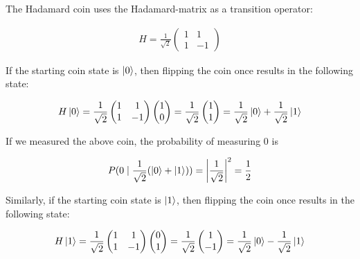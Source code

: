 The Hadamard coin uses the Hadamard-matrix as a transition operator:

\begin{align*}
  H = \frac{1}{\sqrt{2}}\begin{pmatrix}
      1 & 1  \\
      1 & -1
    \end{pmatrix}
\end{align*}

If the starting coin state is $\ket{0}$, then flipping the coin once results in the following state:

\begin{align*}
 H\ket{0} = \frac{1}{\sqrt{2}}\begin{pmatrix}
      1 & 1  \\
      1 & -1
    \end{pmatrix} \begin{pmatrix} 1 \\ 0 \end{pmatrix}
    = \frac{1}{\sqrt{2}} \begin{pmatrix} 1 \\ 1 \end{pmatrix} = \frac{1}{\sqrt{2}} \ket{0} + \frac{1}{\sqrt{2}} \ket{1}
\end{align*}

If we measured the above coin, the probability of measuring $0$ is

\begin{align*}
P(0 \mid \frac{1}{\sqrt{2}} (\ket{0} + \ket{1})) =
\left\lvert\frac{1}{\sqrt{2}}\right\rvert^2 =
\frac{1}{2}
\end{align*}

Similarly, if the starting coin state is $\ket{1}$, then flipping the coin once results in the following state:

\begin{align*}
   H\ket{1} = \frac{1}{\sqrt{2}}\begin{pmatrix}
      1 & 1  \\
      1 & -1
    \end{pmatrix} \begin{pmatrix} 0 \\ 1 \end{pmatrix}
    = \frac{1}{\sqrt{2}} \begin{pmatrix} 1 \\ -1 \end{pmatrix} = \frac{1}{\sqrt{2}} \ket{0} - \frac{1}{\sqrt{2}} \ket{1}
\end{align*}

